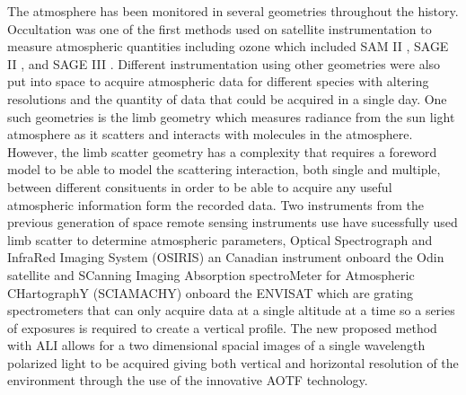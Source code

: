 \documentclass[12pt]{article}
\begin{document}
The atmosphere has been monitored in several geometries throughout the history. Occultation was one of the first methods used on satellite instrumentation to measure atmospheric quantities including ozone which included SAM II \citep{McCormick1979}, SAGE II \citep{McCormick1987}, and SAGE III \citep{Thomason2003}. Different instrumentation using other geometries were also put into space to acquire atmospheric data for different species with altering resolutions and the quantity of data that could be acquired in a single day. One such geometries is the limb geometry which measures radiance from the sun light atmosphere as it scatters and interacts with molecules in the atmosphere. However, the limb scatter geometry has a complexity that requires a foreword model to be able to model the scattering interaction, both single and multiple, between different consituents in order to be able to acquire any useful atmospheric information form the recorded data. Two instruments from the previous generation of space remote sensing instruments use have sucessfully used limb scatter to determine atmospheric parameters, Optical Spectrograph and InfraRed Imaging System (OSIRIS) an Canadian instrument onboard the Odin satellite \citep{Llewellyn2004} and SCanning Imaging Absorption spectroMeter for Atmospheric CHartographY (SCIAMACHY) onboard the ENVISAT \citep{Bovensmann1999} which are grating spectrometers that can only acquire data at a single altitude at a time so a series of exposures is required to create a vertical profile. The new proposed method with ALI allows for a two dimensional spacial images of a single wavelength polarized light to be acquired giving both vertical and horizontal resolution of the environment through the use of the innovative AOTF technology.
\end{document}
